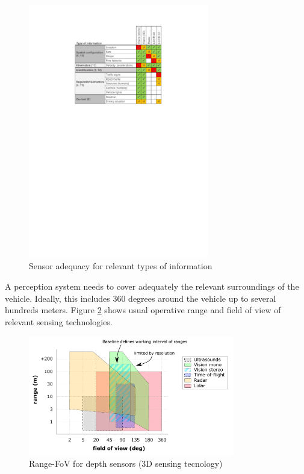 \begin{figure}[h]
    \centering
    \includegraphics[width=0.7\textwidth]{"img/information_types_sensors"}
    \caption{Sensor adequacy for relevant types of information}
    \label{fig:information_vs_sensors}
\end{figure}

A perception system needs to cover adequately the relevant surroundings of the
vehicle. Ideally, this includes 360 degrees around the vehicle up to several
hundreds meters. Figure \ref{fig:range-fov} shows usual operative range and
field of view of relevant sensing technologies. 

\begin{figure}[h]
    \centering
    \includegraphics[width=0.8\textwidth]{"img/plot_range-fov"}
    \caption{Range-FoV for depth sensors (3D sensing tecnology)}
    \label{fig:range-fov}
\end{figure}

